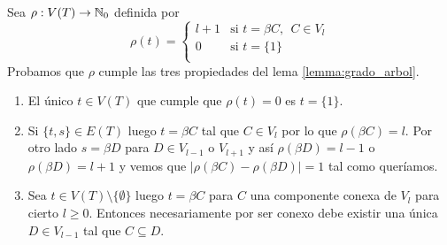 \documentclass[tesis.tex]{subfiles}
\begin{document}
\begin{deff}
	Sea $\rho:V(T) \to \mathbb{N}_{0}$ definida por
	\[
	\rho(t) = 	
	\begin{cases}
		l+1 & \text{si $t = \beta C, \ \ C \in V_{l}$} \\
		0 & \text{si $t = \{1\}$   } \\
	\end{cases}
	\]
	Probamos que $\rho$ cumple las tres propiedades del lema \ref{lemma:grado_arbol}.
	\begin{enumerate}
		\item El único $t \in V(T)$ que cumple que $\rho(t) = 0$ es $t = \{1\}$.
		\item 
			Si $\{t,s\} \in E(T)$ luego $t = \beta C$ tal que $C \in V_{l}$ por lo que $\rho(\beta C) = l$. 
			Por otro lado $s = \beta D$ para $D \in V_{l-1}$ o $V_{l+1}$ y así $\rho(\beta D) = l-1$ o $\rho(\beta D) = l+1$ y vemos que $|\rho(\beta C) - \rho(\beta D)| = 1$ tal como queríamos.
			
		\item 
			Sea $t \in V(T) \setminus \{\emptyset \}$ luego $t = \beta C$ para $C$ una componente conexa de $V_{l}$ para cierto $l \ge 0$. Entonces necesariamente por ser conexo debe existir una única $D \in V_{l-1}$ tal que $C \subseteq D$. 
	\end{enumerate}
	
		
		
		

\end{deff}
\end{document}
